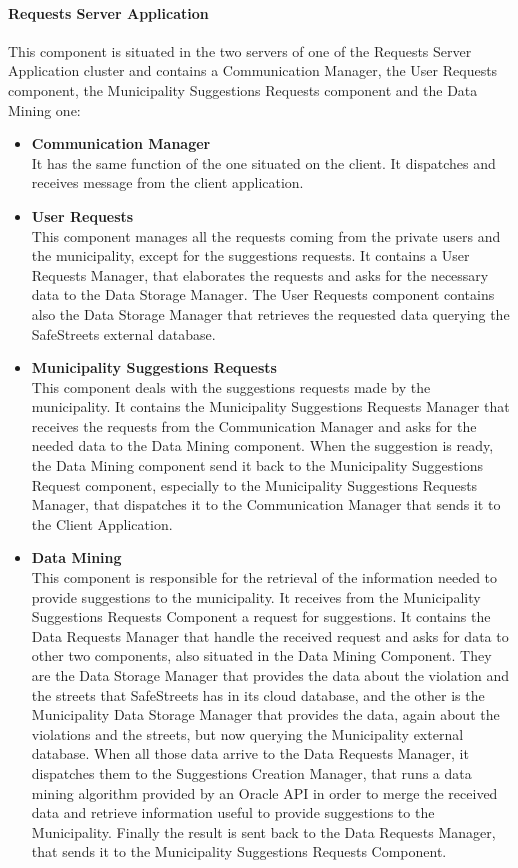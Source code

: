 \documentclass[titlepage]{article}
\begin{document}
\paragraph{\textbf{Requests Server Application}}
This component is situated in the two servers of one of the Requests Server Application cluster and contains a Communication Manager, the User Requests component, the Municipality Suggestions Requests component and the Data Mining one:
\begin{itemize}
\item \textbf{Communication Manager}\\
It has the same function of the one situated on the client. It dispatches and receives message from the client application.
\item \textbf{User Requests}\\
This component manages all the requests coming from the private users and the municipality, except for the suggestions requests. It contains a User Requests Manager, that elaborates the requests and asks for the necessary data to the Data Storage Manager. The User Requests component contains also the Data Storage Manager that retrieves the requested data querying the SafeStreets external database.
\item \textbf{Municipality Suggestions Requests}\\
This component deals with the suggestions requests made by the municipality. It contains the Municipality Suggestions Requests Manager that receives the requests from the Communication Manager and asks for the needed data to the Data Mining component. When the suggestion is ready, the Data Mining component send it back to the Municipality Suggestions Request component, especially to the Municipality Suggestions Requests Manager, that dispatches it to the Communication Manager that sends it to the Client Application.


\item \textbf{Data Mining}\\
This component is responsible for the retrieval of the information needed to provide suggestions to the municipality. It receives from the Municipality Suggestions Requests Component a request for suggestions. It contains the Data Requests Manager that handle the received request and asks for data to other two components, also situated in the Data Mining Component. They are the Data Storage Manager that provides the data about the violation and the streets that SafeStreets has in its cloud database, and the other is the Municipality Data Storage Manager that provides the data, again about the violations and the streets, but now querying the Municipality external database. When all those data arrive to the Data Requests Manager, it dispatches them to the Suggestions Creation Manager, that runs a data mining algorithm provided by an Oracle API in order to merge the received data and retrieve information useful to provide suggestions to the Municipality. Finally the result is sent back to the Data Requests Manager, that sends it to the Municipality Suggestions Requests Component. 
\end{itemize}
\end{document}
